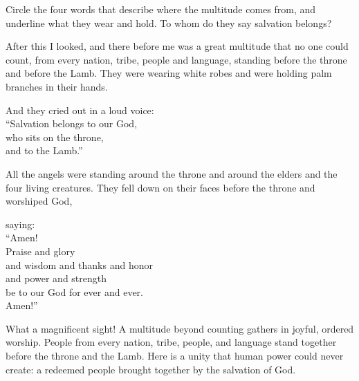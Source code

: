 \begin{ScriptureBox2}{Circle the four words that describe where the multitude comes from, and underline what they wear and hold. To whom do they say salvation belongs?}

\item[7:9] After this I looked, and there before me was a great multitude that no one could count, from every nation, tribe, people and language, standing before the throne and before the Lamb. They were wearing white robes and were holding palm branches in their hands.

\item[7:10] And they cried out in a loud voice:\\
\hspace*{1em}``Salvation belongs to our God,\\
\hspace*{2em}who sits on the throne,\\
\hspace*{1em}and to the Lamb.''

\item[7:11] All the angels were standing around the throne and around the elders and the four living creatures. They fell down on their faces before the throne and worshiped God,

\item[7:12] saying:\\
\hspace*{1em}``Amen!\\
\hspace*{1em}Praise and glory\\
\hspace*{2em}and wisdom and thanks and honor\\
\hspace*{2em}and power and strength\\
\hspace*{1em}be to our God for ever and ever.\\
\hspace*{1em}Amen!''

\end{ScriptureBox2}

What a magnificent sight! A multitude beyond counting gathers in joyful, ordered worship. People from every nation, tribe, people, and language stand together before the throne and the Lamb. Here is a unity that human power could never create: a redeemed people brought together by the salvation of God.


